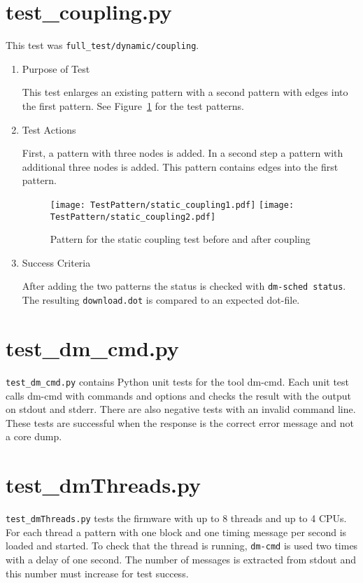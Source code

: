 \documentclass[12pt,a4paper]{report}
\begin{document}
\section{test\_coupling.py}
This test was \texttt{full\_test/dynamic/coupling}.
\begin{enumerate}
  \item Purpose of Test

  This test enlarges an existing pattern with a second pattern with edges into the first
  pattern. See Figure~\ref{fig:Pattern_for_the_static_coupling_test} for the test patterns.
  \item Test Actions

  First, a pattern with three nodes is added. In a second step a pattern with additional three nodes is added.
  This pattern contains edges into the first pattern.
    \begin{figure}
        \centering
        \texttt{[image: TestPattern/static\_coupling1.pdf]}
        \texttt{[image: TestPattern/static\_coupling2.pdf]}
        \caption{Pattern for the static coupling test before and after coupling}
        \label{fig:Pattern_for_the_static_coupling_test}
    \end{figure}
  \item Success Criteria

  After adding the two patterns the status is checked with \texttt{dm-sched status}. The resulting \texttt{download.dot} is
  compared to an expected dot-file.
\end{enumerate}

\section{test\_dm\_cmd.py}
\texttt{test\_dm\_cmd.py} contains Python unit tests for the tool dm-cmd. Each unit test calls dm-cmd
with commands and options and checks the result with the output on stdout and stderr. There are also negative tests with an invalid command
line. These tests are successful when the response is the correct error message and not a core dump.

\section{test\_dmThreads.py}
\texttt{test\_dmThreads.py} tests the firmware with up to 8 threads and up to 4 CPUs.
For each thread a pattern with one block and one timing message per second is loaded and started. To check that the thread is running,
\texttt{dm-cmd} is used two times with a delay of one second. The number of messages is extracted from stdout and this number must
increase for test success.
\end{document}
